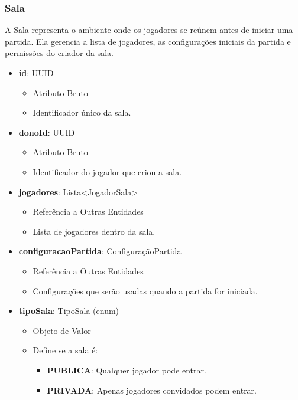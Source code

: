     \subsubsection{Sala}
    A Sala representa o ambiente onde os jogadores se reúnem antes de iniciar uma partida. Ela gerencia a lista de jogadores, as configurações iniciais da partida e permissões do criador da sala.
    \begin{itemize}
        \item \textbf{id}: UUID  
              \begin{itemize}
                  \item Atributo Bruto
                  \item Identificador único da sala.
              \end{itemize}
    
        \item \textbf{donoId}: UUID  
              \begin{itemize}
                  \item Atributo Bruto
                  \item Identificador do jogador que criou a sala.
              \end{itemize}
    
        \item \textbf{jogadores}: Lista\textless JogadorSala\textgreater  
              \begin{itemize}
                  \item Referência a Outras Entidades
                  \item Lista de jogadores dentro da sala.
              \end{itemize}
    
        \item \textbf{configuracaoPartida}: ConfiguraçãoPartida  
              \begin{itemize}
                  \item Referência a Outras Entidades
                  \item Configurações que serão usadas quando a partida for iniciada.
              \end{itemize}
    
        \item \textbf{tipoSala}: TipoSala (enum)  
              \begin{itemize}
                  \item Objeto de Valor
                  \item Define se a sala é:
                  \begin{itemize}
                      \item \textbf{PUBLICA}: Qualquer jogador pode entrar.
                      \item \textbf{PRIVADA}: Apenas jogadores convidados podem entrar.
                  \end{itemize}
              \end{itemize}
    

\end{itemize}
